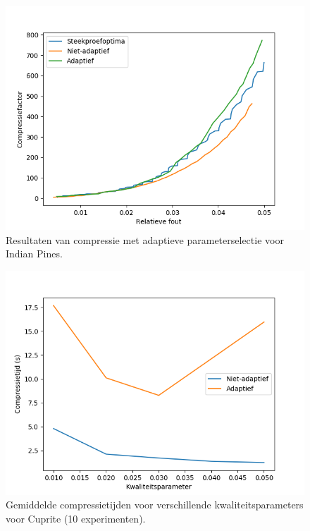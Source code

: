 \begin{figure}[H]
  \centering
  \includegraphics[scale=0.7]{images/parameter_functions_results_including_adaptive_Indian_Pines.png}
  \caption{Resultaten van compressie met adaptieve parameterselectie voor Indian Pines.}
  \label{fig:parameter_functions_results_including_adaptive_Indian_Pines}
\end{figure}

\newpage
\begin{figure}[H]
  \centering
  \includegraphics[scale=0.7]{images/adaptive_timings_Cuprite.png}
  \caption{Gemiddelde compressietijden voor verschillende kwaliteitsparameters voor Cuprite (10 experimenten).}
  \label{fig:adaptive_timings_Cuprite}
\end{figure}

